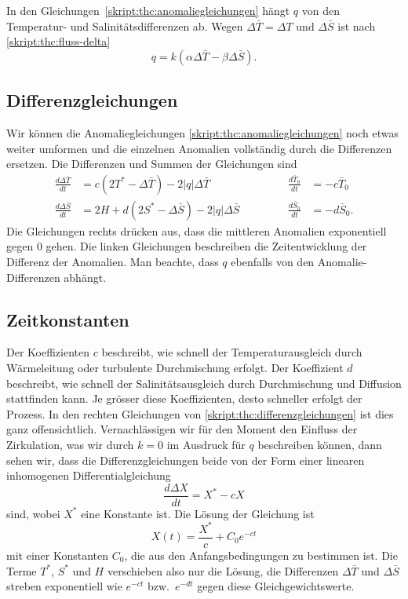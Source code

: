 In den Gleichungen~\eqref{skript:thc:anomaliegleichungen} hängt
$q$ von den Temperatur- und Salinitätsdifferenzen ab.
Wegen $\Delta\bar T=\Delta T$ und $\Delta\bar S$ ist nach
\eqref{skript:thc:fluss-delta}
\begin{equation}
q = k(\alpha\Delta\bar T-\beta \Delta\bar S).
\label{skript:thc:fluss-delta-anomalie}
\end{equation}

\subsection{Differenzgleichungen}
Wir können die Anomaliegleichungen \eqref{skript:thc:anomaliegleichungen}
noch etwas weiter umformen und die einzelnen Anomalien vollständig durch
die Differenzen ersetzen.
Die Differenzen und Summen der Gleichungen sind
\begin{equation}
\begin{aligned}
\frac{d\Delta\bar T}{dt}
&=
c(2T^*-\Delta\bar T)-2|q|\Delta\bar T
&&\qquad&
\frac{d\bar T_0}{dt}
&=
-c\bar T_0
\\
\frac{d\Delta\bar S}{dt}
&=
2H+d(2S^*-\Delta\bar S) - 2|q|\Delta\bar S
&&\qquad&
\frac{d\bar S_0}{dt}
&=
-d\bar S_0.
\end{aligned}
\label{skript:thc:differenzgleichungen}
\end{equation}
Die Gleichungen rechts drücken aus, dass die mittleren Anomalien
exponentiell gegen $0$ gehen.
Die linken Gleichungen beschreiben die Zeitentwicklung der Differenz
der Anomalien.
Man beachte, dass $q$ ebenfalls von den Anomalie-Differenzen abhängt.

\subsection{Zeitkonstanten}
\label{skript:thc:zeitkonstanten}
Der Koeffizienten $c$ beschreibt, wie schnell der Temperaturausgleich
durch Wärmeleitung oder turbulente Durchmischung erfolgt.
Der Koeffizient $d$ beschreibt, wie schnell der Salinitätsausgleich
durch Durchmischung und Diffusion stattfinden kann.
Je grösser diese Koeffizienten, desto schneller erfolgt der Prozess.
In den rechten Gleichungen von \eqref{skript:thc:differenzgleichungen}
ist dies ganz offensichtlich.
Vernachlässigen wir für den Moment den Einfluss der Zirkulation,
was wir durch $k=0$ im Ausdruck für $q$ beschreiben können, dann
sehen wir, dass die Differenzgleichungen beide von der Form
einer linearen inhomogenen Differentialgleichung
\[
\frac{d\Delta X}{dt}
=
X^* -cX
\]
sind, wobei $X^*$ eine Konstante ist.
Die Lösung der Gleichung ist
\[
X(t) = \frac{X^*}{c} + C_0 e^{-ct}
\]
mit einer Konstanten $C_0$, die aus den Anfangsbedingungen zu
bestimmen ist.
Die Terme $T^*$, $S^*$ und $H$ verschieben also nur die Lösung,
die Differenzen $\Delta\bar T$ und $\Delta\bar S$ streben exponentiell
wie $e^{-ct}$ bzw.~$e^{-dt}$ gegen diese Gleichgewichtswerte.

